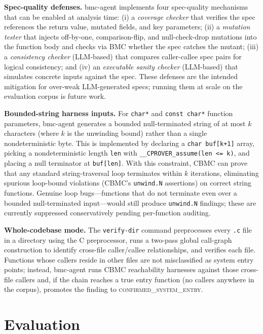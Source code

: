 \documentclass[11pt,a4paper]{article}
\newcommand{\tool}{bmc-agent\xspace}
\newcommand{\sysconf}{\textsc{confirmed\_system\_entry}\xspace}
\begin{document}
\smallskip\noindent\textbf{Spec-quality defenses.}
\tool implements four spec-quality mechanisms that can be enabled at analysis
time: (i) a \emph{coverage checker} that verifies the spec references the
return value, mutated fields, and key parameters; (ii) a \emph{mutation
tester} that injects off-by-one, comparison-flip, and null-check-drop
mutations into the function body and checks via BMC whether the spec catches
the mutant; (iii) a \emph{consistency checker} (LLM-based) that compares
caller-callee spec pairs for logical consistency; and (iv) an \emph{executable
sanity checker} (LLM-based) that simulates concrete inputs against the spec.
These defenses are the intended mitigation for over-weak LLM-generated specs;
running them at scale on the evaluation corpus is future work.

\smallskip\noindent\textbf{Bounded-string harness inputs.}
For \texttt{char*} and \texttt{const char*} function parameters, \tool
generates a bounded null-terminated string of at most $k$ characters
(where $k$ is the unwinding bound) rather than a single nondeterministic
byte. This is implemented by declaring a \texttt{char buf[k+1]} array,
picking a nondeterministic length \texttt{len} with
\texttt{\_\_CPROVER\_assume(len <= k)}, and placing a null terminator at
\texttt{buf[len]}. With this constraint, CBMC can prove that any standard
string-traversal loop terminates within $k$ iterations, eliminating spurious
loop-bound violations (CBMC's \texttt{unwind.N} assertions) on correct
string functions. Genuine loop bugs---functions that do not terminate even
over a bounded null-terminated input---would still produce \texttt{unwind.N}
findings; these are currently suppressed conservatively pending per-function
auditing.

\smallskip\noindent\textbf{Whole-codebase mode.}
The \verb|verify-dir| command preprocesses every \texttt{.c} file in a
directory using the C preprocessor, runs a two-pass global call-graph
construction to identify cross-file caller/callee relationships, and verifies
each file. Functions whose callers reside in other files are not
misclassified as system entry points; instead, \tool runs CBMC reachability
harnesses against those cross-file callers and, if the chain reaches a true
entry function (no callers anywhere in the corpus), promotes the finding to
\sysconf.

\section{Evaluation}
\label{sec:evaluation}
\end{document}
